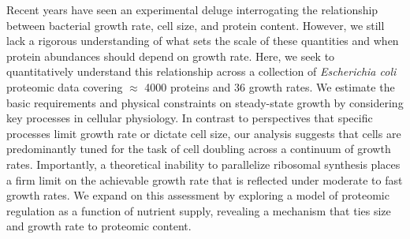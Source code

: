 Recent years have seen an experimental deluge interrogating the relationship
between bacterial growth rate, cell size, and protein content. However, we still
lack a rigorous understanding of what sets the scale of these quantities and
when protein abundances should depend on growth rate. Here, we seek to
quantitatively understand this relationship across a collection of
\textit{Escherichia coli} proteomic data covering $\approx$ 4000 proteins and 36
growth rates. We estimate the basic requirements and physical constraints on
steady-state growth by considering key processes in cellular physiology. In
contrast to perspectives that specific processes limit growth rate or dictate
cell size, our analysis suggests that cells are predominantly tuned for the task
of cell doubling across a continuum of growth rates. Importantly, a theoretical
inability to parallelize ribosomal synthesis places a firm limit on the
achievable growth rate that is reflected under moderate to fast growth rates. We
expand on this assessment by exploring a model of proteomic regulation as a
function of nutrient supply, revealing a mechanism that ties size and growth
rate to proteomic content.

